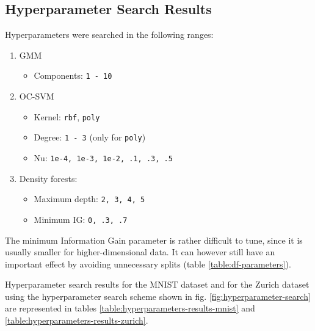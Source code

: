 \documentclass[10pt]{article}
\begin{document}
\subsection{Hyperparameter Search Results}
\label{app:hyperparameters}
Hyperparameters were searched in the following ranges:
\begin{enumerate}
    \item \gls{GMM}
    \begin{itemize}
        \item Components: \texttt{1 - 10}
    \end{itemize}
    \item OC-SVM
    \begin{itemize}
        \item Kernel: \texttt{rbf}, \texttt{poly}
        \item Degree: \texttt{1 - 3} (only for \texttt{poly})
        \item Nu: \texttt{1e-4, 1e-3, 1e-2, .1, .3, .5}
    \end{itemize}
    \item Density forests:
    \begin{itemize}
        \item Maximum depth: \texttt{2, 3, 4, 5}
        \item Minimum IG: \texttt{0, .3, .7}
    \end{itemize}
\end{enumerate}


The minimum Information Gain parameter is rather difficult to tune, since it is usually smaller for higher-dimensional data. It can however still have an important effect by avoiding unnecessary splits (table \ref{table:df-parameters}).

Hyperparameter search results for the MNIST dataset and for the Zurich dataset using the hyperparameter search scheme shown in fig. \ref{fig:hyperparameter-search} are represented in tables \ref{table:hyperparameters-results-mnist} and \ref{table:hyperparameters-results-zurich}.
\end{document}
